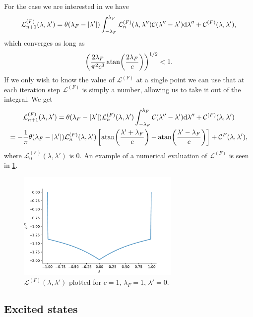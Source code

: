 \documentclass[11pt, a4paper]{report} %
\begin{document}
For the case we are interested in we have 
\begin{equation}
  \mathcal{L}^{(F)}_{n+1} (\lambda, \lambda') = \theta(\lambda_F - \abs{\lambda'}) \int_{-\lambda_F}^{\lambda_F} \mathcal{L}^{(F)}_n(\lambda, \lambda'') \mathcal{C} (\lambda''-\lambda') \dd \lambda'' + \mathcal{C}^{(F)}(\lambda, \lambda'),
\end{equation}
which converges as long as 
\begin{equation}
\left(\frac{2\lambda_F}{\pi^2c^3} \atan(\frac{2\lambda_F}{c})\right)^{1/2} < 1.
\end{equation}
If we only wish to know the value of $\mathcal{L}^{(F)}$ at a single point we can
use that at each iteration step $\mathcal{L}^{(F)}$ is simply a number, allowing us to take it out of the integral.
We get
\begin{gather}
  \mathcal{L}^{(F)}_{n+1} (\lambda, \lambda') = \theta(\lambda_F - \abs{\lambda'})  \mathcal{L}^{(F)}_n(\lambda, \lambda') \int_{-\lambda_F}^{\lambda_F} \mathcal{C} (\lambda''-\lambda') \dd \lambda'' + \mathcal{C}^{(F)}(\lambda, \lambda')\\
= - \frac{1}{\pi} \theta(\lambda_F - \abs{\lambda'}) \mathcal{L}^{(F)}_n(\lambda, \lambda') \left[ \atan(\frac{\lambda'+\lambda_F}{c}) - \atan(\frac{\lambda'-\lambda_F}{c})\right] + \mathcal{C}^{F}(\lambda,\lambda'),
\end{gather}
where \(\mathcal{L}^{(F)}_0(\lambda, \lambda')\) is 0. An example of a numerical evaluation of \(\mathcal{L}^{(F)}\) is seen in \cref{fig:lfplot}.
\begin{figure}[tb!]
  \centering
  \includegraphics[width=0.7\textwidth]{lfplot.pdf}
  \caption{\(\mathcal{L}^{(F)}(\lambda,\lambda')\) plotted for \(c=1\), \(\lambda_F = 1\), \(\lambda'=0\).}
  \label{fig:lfplot}
\end{figure}

\subsection{Excited states}
\end{document}
